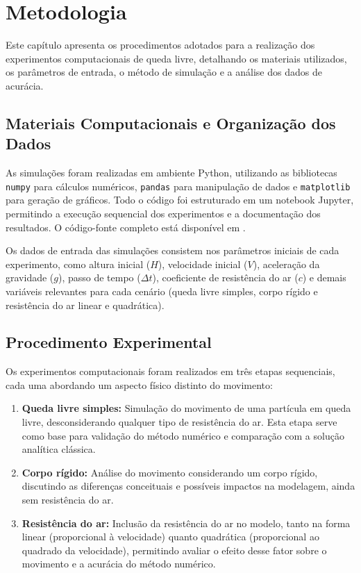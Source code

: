\chapter{Metodologia}
\label{chap_metodologia}
Este capítulo apresenta os procedimentos adotados para a realização dos experimentos computacionais de queda livre, detalhando os materiais utilizados, os parâmetros de entrada, o método de simulação e a análise dos dados de acurácia.

\section{Materiais Computacionais e Organização dos Dados}
As simulações foram realizadas em ambiente Python, utilizando as bibliotecas \texttt{numpy} para cálculos numéricos, \texttt{pandas} para manipulação de dados e \texttt{matplotlib} para geração de gráficos. Todo o código foi estruturado em um notebook Jupyter, permitindo a execução sequencial dos experimentos e a documentação dos resultados. O código-fonte completo está disponível em \cite{codigoqueda2026}.

Os dados de entrada das simulações consistem nos parâmetros iniciais de cada experimento, como altura inicial ($H$), velocidade inicial ($V$), aceleração da gravidade ($g$), passo de tempo ($\Delta t$), coeficiente de resistência do ar ($c$) e demais variáveis relevantes para cada cenário (queda livre simples, corpo rígido e resistência do ar linear e quadrática).
\section{Procedimento Experimental}


Os experimentos computacionais foram realizados em três etapas sequenciais, cada uma abordando um aspecto físico distinto do movimento:
\begin{enumerate}
	\item \textbf{Queda livre simples:} Simulação do movimento de uma partícula em queda livre, desconsiderando qualquer tipo de resistência do ar. Esta etapa serve como base para validação do método numérico e comparação com a solução analítica clássica.
	\item \textbf{Corpo rígido:} Análise do movimento considerando um corpo rígido, discutindo as diferenças conceituais e possíveis impactos na modelagem, ainda sem resistência do ar.
	\item \textbf{Resistência do ar:} Inclusão da resistência do ar no modelo, tanto na forma linear (proporcional à velocidade) quanto quadrática (proporcional ao quadrado da velocidade), permitindo avaliar o efeito desse fator sobre o movimento e a acurácia do método numérico.
\end{enumerate}

